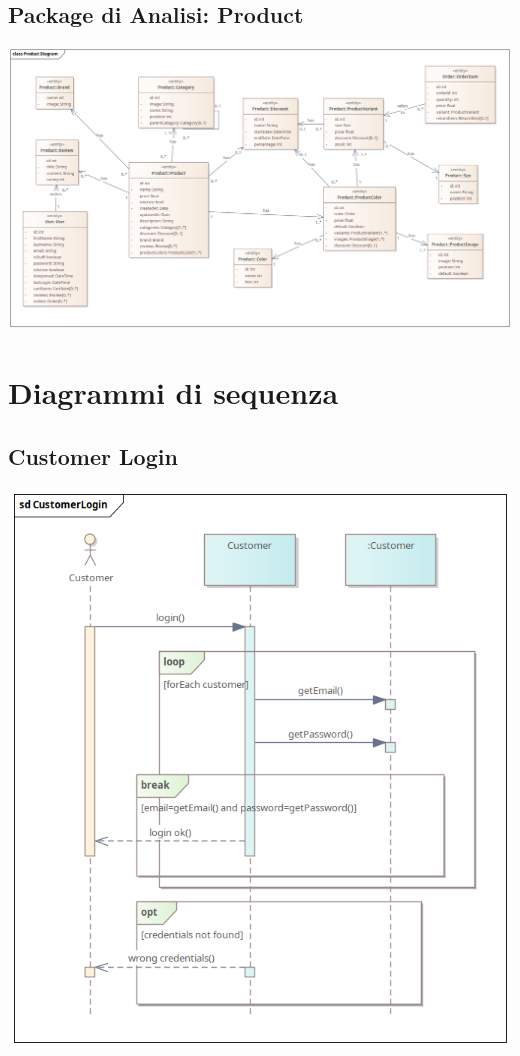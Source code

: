 \subsection{Package di Analisi: Product}
\begin{center}
  \includegraphics[width=\textwidth]{immagini/Analisi/ClassDiagrams/Product.png}
\end{center}

\clearpage

\section{Diagrammi di sequenza}
\subsection{Customer Login}
\begin{center}
  \includegraphics[width=\textwidth]{immagini/Analisi/SequenceDiagrams/CustomerLogin.png}
\end{center}

